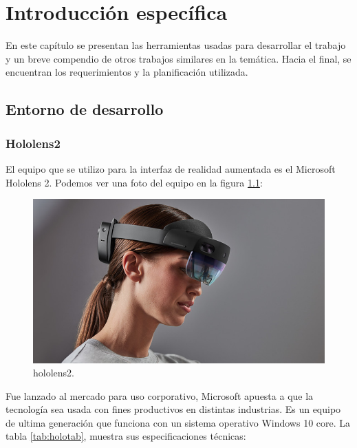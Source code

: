 \chapter{Introducción específica} %

\label{Chapter2}

En este capítulo se presentan las herramientas usadas para desarrollar el trabajo y un breve compendio de otros trabajos similares en la temática. Hacia el final, se encuentran los requerimientos y la planificación utilizada.

\section{Entorno de desarrollo}
\subsection{Hololens2}

El equipo que se utilizo para la interfaz de realidad aumentada es el Microsoft Hololens 2. Podemos ver una foto del equipo en la figura \ref{fig:hololens2}:

\begin{figure}[htpb]
	\centering
	\includegraphics[scale=.5]{./Figures/hololens2.jpeg}
	\caption{hololens2\protect\footnotemark.}
	\label{fig:hololens2}
\end{figure}



Fue lanzado al mercado para uso corporativo, Microsoft apuesta a que la tecnología sea usada con fines productivos en distintas industrias. Es un equipo de ultima generación que funciona con un sistema operativo Windows 10 core.  La tabla \ref{tab:holotab}, muestra sus especificaciones técnicas:

